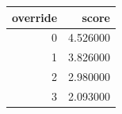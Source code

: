 \begin{tabular}{rr}
\toprule
override & score \\
\midrule
0 & 4.526000 \\
1 & 3.826000 \\
2 & 2.980000 \\
3 & 2.093000 \\
\bottomrule
\end{tabular}
